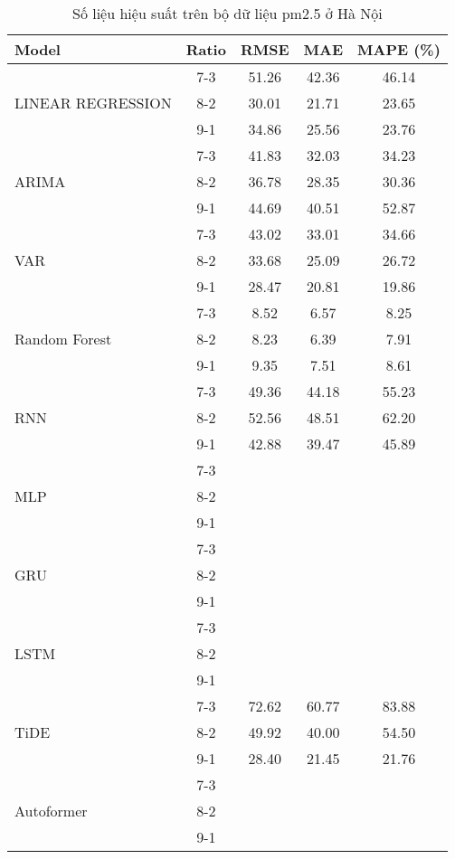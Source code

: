 \begin{table}[h!]
    \centering
    \caption{Số liệu hiệu suất trên bộ dữ liệu pm2.5 ở Hà Nội}
    \begin{tabular}{|l|c|c|c|c|}
    \hline
    \rowcolor{orange!30} \textbf{Model} & \textbf{Ratio} & \textbf{RMSE} & \textbf{MAE} & \textbf{MAPE (\%)} \\ \hline
    \rowcolor{white}  & 7-3 & 51.26 & 42.36 & 46.14 \\ 
    \rowcolor{white}  LINEAR REGRESSION & 8-2 & 30.01 & 21.71 & 23.65 \\ 
    \rowcolor{white}  & 9-1 & 34.86 & 25.56 & 23.76 \\ \hline
    \rowcolor{white}  & 7-3 & 41.83 & 32.03 & 34.23 \\ 
    \rowcolor{white} ARIMA & 8-2 & 36.78 & 28.35 & 30.36 \\ 
    \rowcolor{white}  & 9-1 & 44.69 & 40.51 & 52.87 \\ \hline
    \rowcolor{white}  & 7-3 & 43.02 & 33.01 & 34.66 \\ 
    \rowcolor{white} VAR & 8-2 & 33.68 & 25.09 & 26.72 \\ 
    \rowcolor{white}  & 9-1 & 28.47 & 20.81 & 19.86 \\ \hline
    \rowcolor{white} & 7-3 & 8.52 & 6.57 & 8.25 \\ 
    \rowcolor{white} Random Forest & 8-2 & 8.23 & 6.39 & 7.91 \\ 
    \rowcolor{white} & 9-1 & 9.35 & 7.51 & 8.61 \\ \hline
    \rowcolor{white}  & 7-3 & 49.36 & 44.18 & 55.23 \\ 
    \rowcolor{white} RNN & 8-2 & 52.56 & 48.51 & 62.20 \\
    \rowcolor{white}  & 9-1 & 42.88 & 39.47 & 45.89 \\ \hline
    \rowcolor{white} & 7-3 &  &  &  \\ 
    \rowcolor{white} MLP & 8-2 &  &  &  \\ 
    \rowcolor{white} & 9-1 &  &  &  \\ \hline
    \rowcolor{white} & 7-3 &  &  &  \\ 
    \rowcolor{white} GRU & 8-2 &  &  &  \\ 
    \rowcolor{white} & 9-1 &  &  &  \\ \hline
    \rowcolor{white} & 7-3 &  &  &  \\ 
    \rowcolor{white} LSTM & 8-2 &  &  &  \\ 
    \rowcolor{white} & 9-1 &  &  &  \\ \hline
    \rowcolor{white!30} & 7-3 & 72.62 & 60.77 & 83.88 \\ 
    \rowcolor{white!30} TiDE & 8-2 & 49.92 & 40.00 & 54.50 \\ 
    \rowcolor{white!30} & 9-1 & 28.40 & 21.45 & 21.76 \\ \hline
    \rowcolor{white} & 7-3 &  &  &  \\ 
    \rowcolor{white} Autoformer & 8-2 &  &  &  \\ 
    \rowcolor{white} & 9-1 &  &  &  \\ \hline

    \end{tabular}
\end{table}